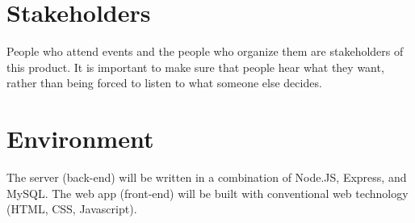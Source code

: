 \documentclass[11pt,fleqn]{article}
\begin{document}
\section{Stakeholders}
People who attend events and the people who organize them are stakeholders of
this product. It is important to make sure that people hear what they want,
rather than being forced to listen to what someone else decides.

\section{Environment}
The server (back-end) will be written in a combination of Node.JS, Express,
and MySQL. The web app (front-end) will be built with conventional web
technology (HTML, CSS, Javascript).
\end{document}
